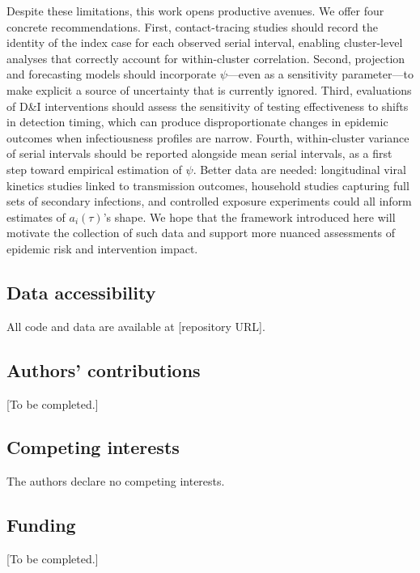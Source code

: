 \documentclass[10pt]{article}
\begin{document}
Despite these limitations, this work opens productive avenues. We offer four concrete recommendations. First, contact-tracing studies should record the identity of the index case for each observed serial interval, enabling cluster-level analyses that correctly account for within-cluster correlation. Second, projection and forecasting models should incorporate $\psi$---even as a sensitivity parameter---to make explicit a source of uncertainty that is currently ignored. Third, evaluations of D\&I interventions should assess the sensitivity of testing effectiveness to shifts in detection timing, which can produce disproportionate changes in epidemic outcomes when infectiousness profiles are narrow. Fourth, within-cluster variance of serial intervals should be reported alongside mean serial intervals, as a first step toward empirical estimation of $\psi$. Better data are needed: longitudinal viral kinetics studies linked to transmission outcomes, household studies capturing full sets of secondary infections, and controlled exposure experiments could all inform estimates of $a_i(\tau)$'s shape. We hope that the framework introduced here will motivate the collection of such data and support more nuanced assessments of epidemic risk and intervention impact.

\subsection*{Data accessibility}
All code and data are available at [repository URL].

\subsection*{Authors' contributions}
[To be completed.]

\subsection*{Competing interests}
The authors declare no competing interests.

\subsection*{Funding}
[To be completed.]




\end{document}
